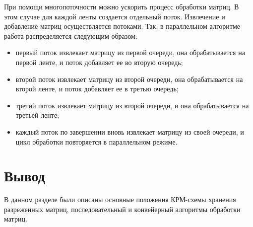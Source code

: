 При помощи многопоточности можно ускорить процесс обработки матриц.
В этом случае для каждой ленты создается отдельный поток. Извлечение
и добавление матриц осуществляется потоками. Так, в параллельном алгоритме работа распределяется следующим образом:
\begin{itemize}
	\item первый поток извлекает матрицу из первой очереди, она обрабатывается на первой ленте, и поток добавляет ее во вторую очередь;
	\item второй поток извлекает матрицу из второй очереди, она обрабатывается на второй ленте, и поток добавляет ее в третью очередь;
	\item третий поток извлекает матрицу из второй очереди, и она обрабатывается на третьей ленте;
	\item каждый поток по завершении вновь извлекает матрицу из своей очереди, и цикл обработки повторяется в параллельном режиме.
\end{itemize}

\section*{Вывод}

В данном разделе были описаны основные положения КРМ-схемы хранения разреженных матриц, последовательный и конвейерный алгоритмы обработки матриц.